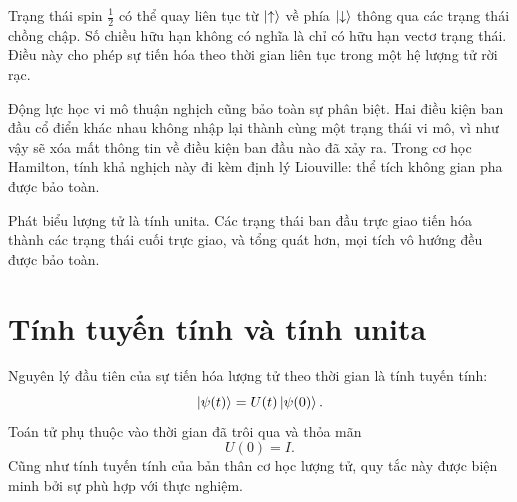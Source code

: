 Trạng thái spin \(\tfrac12\) có thể quay liên tục từ \(\left\lvert\uparrow\right\rangle\) về phía \(\left\lvert\downarrow\right\rangle\) thông qua các trạng thái chồng chập. Số chiều hữu hạn không có nghĩa là chỉ có hữu hạn vectơ trạng thái. Điều này cho phép sự tiến hóa theo thời gian liên tục trong một hệ lượng tử rời rạc.

Động lực học vi mô thuận nghịch cũng bảo toàn sự phân biệt. Hai điều kiện ban đầu cổ điển khác nhau không nhập lại thành cùng một trạng thái vi mô, vì như vậy sẽ xóa mất thông tin về điều kiện ban đầu nào đã xảy ra. Trong cơ học Hamilton, tính khả nghịch này đi kèm định lý Liouville: thể tích không gian pha được bảo toàn.

\begin{classroomqa}
\end{classroomqa}

Phát biểu lượng tử là tính unita. Các trạng thái ban đầu trực giao tiến hóa thành các trạng thái cuối trực giao, và tổng quát hơn, mọi tích vô hướng đều được bảo toàn.

\begin{classroomqa}
\end{classroomqa}

\section{Tính tuyến tính và tính unita}

Nguyên lý đầu tiên của sự tiến hóa lượng tử theo thời gian là tính tuyến tính:
\begin{equation}
\left\lvert\psi(t)\right\rangle=U(t)\left\lvert\psi(0)\right\rangle.
\end{equation}
Toán tử phụ thuộc vào thời gian đã trôi qua và thỏa mãn
\begin{equation}
U(0)=I.
\end{equation}
Cũng như tính tuyến tính của bản thân cơ học lượng tử, quy tắc này được biện minh bởi sự phù hợp với thực nghiệm.


